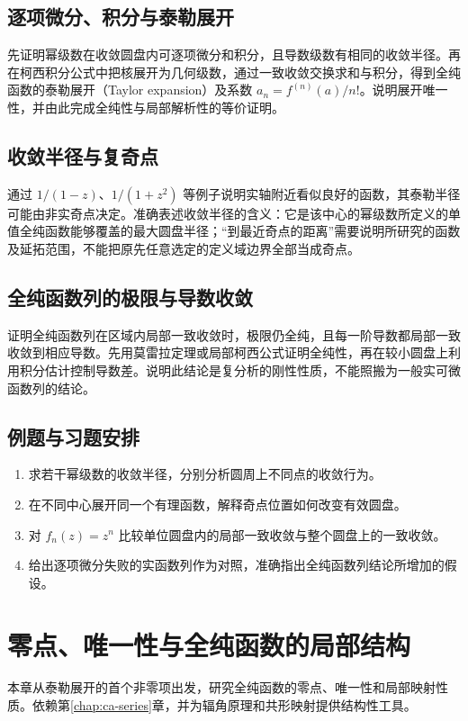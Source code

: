 \documentclass[UTF8,12pt,a4paper,fontset=fandol]{ctexbook}
\begin{document}
\section{逐项微分、积分与泰勒展开}
先证明幂级数在收敛圆盘内可逐项微分和积分，且导数级数有相同的收敛半径。再在柯西积分公式中把核展开为几何级数，通过一致收敛交换求和与积分，得到全纯函数的泰勒展开（Taylor expansion）及系数 $a_n=f^{(n)}(a)/n!$。说明展开唯一性，并由此完成全纯性与局部解析性的等价证明。

\section{收敛半径与复奇点}
通过 $1/(1-z)$、$1/(1+z^2)$ 等例子说明实轴附近看似良好的函数，其泰勒半径可能由非实奇点决定。准确表述收敛半径的含义：它是该中心的幂级数所定义的单值全纯函数能够覆盖的最大圆盘半径；“到最近奇点的距离”需要说明所研究的函数及延拓范围，不能把原先任意选定的定义域边界全部当成奇点。

\section{全纯函数列的极限与导数收敛}
证明全纯函数列在区域内局部一致收敛时，极限仍全纯，且每一阶导数都局部一致收敛到相应导数。先用莫雷拉定理或局部柯西公式证明全纯性，再在较小圆盘上利用积分估计控制导数差。说明此结论是复分析的刚性性质，不能照搬为一般实可微函数列的结论。

\section{例题与习题安排}
\begin{enumerate}
  \item 求若干幂级数的收敛半径，分别分析圆周上不同点的收敛行为。
  \item 在不同中心展开同一个有理函数，解释奇点位置如何改变有效圆盘。
  \item 对 $f_n(z)=z^n$ 比较单位圆盘内的局部一致收敛与整个圆盘上的一致收敛。
  \item 给出逐项微分失败的实函数列作为对照，准确指出全纯函数列结论所增加的假设。
\end{enumerate}

\chapter{零点、唯一性与全纯函数的局部结构}
\label{chap:ca-local}

本章从泰勒展开的首个非零项出发，研究全纯函数的零点、唯一性和局部映射性质。依赖第\ref{chap:ca-series}章，并为辐角原理和共形映射提供结构性工具。
\end{document}
